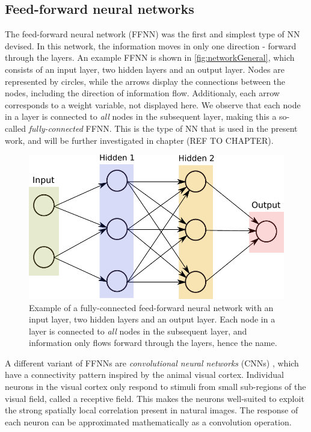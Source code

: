 \documentclass[twoside,english]{uiofysmaster}
\begin{document}
\subsection{Feed-forward neural networks}
The feed-forward neural network (FFNN) was the first and simplest type of NN devised. In this network, 
the information moves in only one direction - forward through the layers. An example FFNN is shown
in \autoref{fig:networkGeneral}, which consists of an input layer, two hidden layers and an output layer. 
Nodes are represented by circles, while the arrows display the connections between the nodes, including the 
direction of information flow. Additionaly, each arrow corresponds to a weight variable, not displayed here. 
We observe that each node in a layer is connected to \textit{all} nodes in the subsequent layer, 
making this a so-called \textit{fully-connected} FFNN. 
This is the type of NN that is used in the present work, 
and will be further investigated in chapter (REF TO CHAPTER).
\begin{figure}
 \begin{center}
  \includegraphics[width=\linewidth]{Figures/Theory/networkGeneral.pdf}
  \caption{Example of a fully-connected feed-forward neural network with an input layer, two hidden layers
	   and an output layer. Each node in a layer is connected to \textit{all} nodes in the subsequent layer, 
	   and information only flows forward through the layers, hence the name.}
  \label{fig:networkGeneral}
 \end{center}
\end{figure}

A different variant of FFNNs are \textit{convolutional neural networks} (CNNs) \cite{LeCun99}, which have a connectivity pattern
inspired by the animal visual cortex. Individual neurons in the visual cortex only respond to stimuli from
small sub-regions of the visual field, called a receptive field. This makes the neurons well-suited to exploit the strong
spatially local correlation present in natural images. The response of each neuron can be approximated mathematically 
as a convolution operation. 
\end{document}
